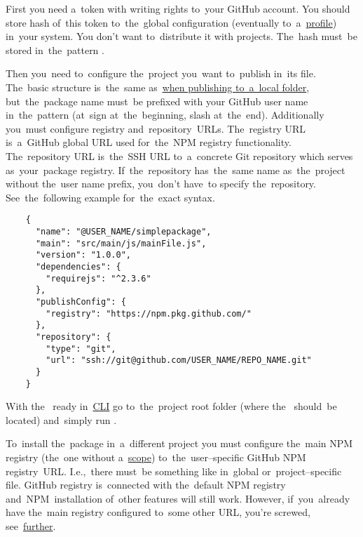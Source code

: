 \label{npmpublishgithub}
First you need a~token with writing rights to~your GitHub account.
You should store hash of~this token to~the~global  configuration (eventually to~a~\hyperref[npmprofile]{profile}) in~your system.
You don't want to~distribute it with projects.
The~hash must~be stored in~the~pattern .

Then you~need to~configure the~project you~want to~publish in~its  file.
The~basic structure is~the~same as~\hyperref[npmpublishlocal]{when publishing to~a~local folder}, but~the~package name must~be prefixed with your GitHub user name in~the~pattern  (at~sign at~the~beginning, slash at~the~end).
Additionally you~must configure registry and~repository~URLs.
The~registry URL is~a~GitHub global URL used for~the~NPM registry functionality.
The~repository URL is~the~SSH URL to~a~concrete Git repository which serves as~your~package registry.
If~the~repository has~the~same name as~the~project without the~user name prefix, you~don't have~to specify the~repository.
See~the~following example for~the~exact syntax.

\begin{lstlisting}
    {
      "name": "@USER_NAME/simplepackage",
      "main": "src/main/js/mainFile.js",
      "version": "1.0.0",
      "dependencies": {
        "requirejs": "^2.3.6"
      },
      "publishConfig": {
        "registry": "https://npm.pkg.github.com/"
      },
      "repository": {
        "type": "git",
        "url": "ssh://git@github.com/USER_NAME/REPO_NAME.git"
      }
    }
\end{lstlisting}

\noindent With the~ ready in~\hyperref[shellcligui]{CLI} go to~the~project root folder (where the~ should~be located) and~simply run .
\newline

\noindent To~install the~package in~a~different project you must configure the~main NPM registry (the~one without a~\hyperref[npmscope]{scope}) to~the~user--specific GitHub NPM registry~URL\@.
I.e.,~there must~be something like  in~global or~project--specific  file.
GitHub registry is~connected with the~default NPM registry and~NPM~installation of~other features will still work.
However, if~you~already have the~main registry configured to~some other URL,  you're screwed, see~\hyperref[multipleregistries]{further}.

